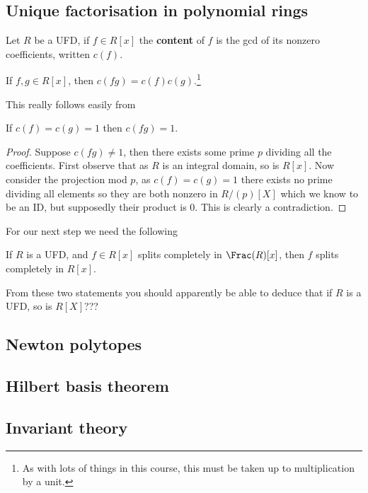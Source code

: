 \documentclass{article}
\begin{document}
\subsection{Unique factorisation in polynomial rings}

\begin{definition}
    Let $R$ be a UFD, if $f\in R[x]$ the \textbf{content} of $f$ is the gcd of its nonzero coefficients, written $c(f)$.
\end{definition}

\begin{lemma}
    If $f,g\in R[x]$, then $c(fg)=c(f)c(g)$.\footnote{As with lots of things in this course, this must be taken up to multiplication by a unit.}
\end{lemma}

This really follows easily from

\begin{lemma}
    If $c(f)=c(g)=1$ then $c(fg)=1$.
    \begin{proof}
        Suppose $c(fg)\neq 1$, then there exists some prime $p$ dividing all the coefficients. First observe that as $R$ is an integral domain, so is $R[x]$. Now consider the projection mod $p$, as $c(f)=c(g)=1$ there exists no prime dividing all elements so they are both nonzero in $R/(p)[X]$ which we know to be an ID, but supposedly their product is $0$. This is clearly a contradiction.
    \end{proof}
\end{lemma}

For our next step we need the following 

\begin{theorem}
    If $R$ is a UFD, and $f\in R[x]$ splits completely in $\Frac(R)[x]$, then $f$ splits completely in $R[x]$.
\end{theorem}

From these two statements you should apparently be able to deduce that if $R$ is a UFD, so is $R[X]$???

\subsection{Newton polytopes}

\subsection{Hilbert basis theorem}

\subsection{Invariant theory}
\end{document}

